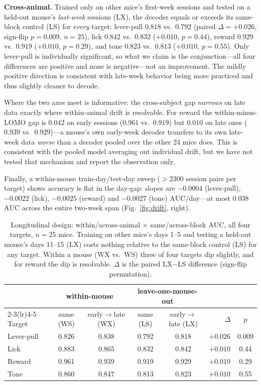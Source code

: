 \documentclass{article}
\newcommand{\auc}{\mathrm{AUC}}
\begin{document}
\textbf{Cross-animal.} Trained only on other mice's first-week sessions and tested on a held-out
mouse's \emph{last-week} sessions (LX), the decoder equals or exceeds its same-block control (LS)
for \emph{every} target: lever-pull $0.818$ vs.\ $0.792$ (paired $\Delta=+0.026$, sign-flip
$p=0.009$, $n=25$), lick $0.842$ vs.\ $0.832$ ($+0.010$, $p=0.44$), reward $0.929$ vs.\ $0.919$
($+0.010$, $p=0.29$), and tone $0.823$ vs.\ $0.813$ ($+0.010$, $p=0.55$). Only lever-pull is
individually significant, so what we claim is the conjunction---all four differences are positive
and none is negative---not an improvement. The mildly positive direction is consistent with
late-week behavior being more practiced and thus slightly cleaner to decode.

Where the two axes meet is informative: the cross-subject gap \emph{narrows} on late data exactly
where within-animal drift is resolvable. For reward the within-minus-LOMO gap is $0.042$ on early
sessions ($0.961$ vs.\ $0.919$) but $0.010$ on late ones ($0.939$ vs.\ $0.929$)---a mouse's own
early-week decoder transfers to its own late-week data \emph{worse} than a decoder pooled over the
other 24 mice does. This is consistent with the pooled model averaging out individual drift, but we
have not tested that mechanism and report the observation only.

Finally, a within-mouse train-day/test-day sweep ($>2300$ session pairs per target) shows accuracy
is flat in the day-gap: slopes are $-0.0004$ (lever-pull), $-0.0022$ (lick), $-0.0025$ (reward) and
$-0.0027$ (tone) $\auc$/day---at most $0.038$ $\auc$ across the entire two-week span
(Fig.~\ref{fig:drift}, right).

\begin{table}[t]\centering
\caption{Longitudinal design: within/across-animal $\times$ same/across-block $\auc$, all four
targets, $n=25$ mice. Training on other mice's days 1--5 and testing a held-out mouse's days
11--15 (LX) costs nothing relative to the same-block control (LS) for any target. Within a mouse
(WX vs.\ WS) three of four targets dip slightly, and for reward the dip is resolvable.
$\Delta$ is the paired LX$-$LS difference (sign-flip permutation).}
\label{tab:drift}
\setlength{\tabcolsep}{4pt}
\begin{tabular}{lccccrc}
\toprule
 & \multicolumn{2}{c}{within-mouse} & \multicolumn{2}{c}{leave-one-mouse-out} & \\
\cmidrule(lr){2-3}\cmidrule(lr){4-5}
Target & same (WS) & early$\to$late (WX) & same (LS) & early$\to$late (LX) & $\Delta$ & $p$ \\
\midrule
Lever-pull & 0.826 & 0.838 & 0.792 & 0.818 & $+0.026$ & 0.009 \\
Lick       & 0.883 & 0.865 & 0.832 & 0.842 & $+0.010$ & 0.44 \\
Reward     & 0.961 & 0.939 & 0.919 & 0.929 & $+0.010$ & 0.29 \\
Tone       & 0.860 & 0.847 & 0.813 & 0.823 & $+0.010$ & 0.55 \\
\bottomrule
\end{tabular}
\end{table}
\end{document}
